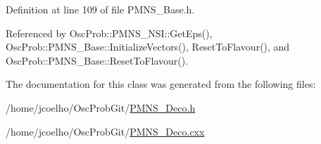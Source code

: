 Definition at line 109 of file P\+M\+N\+S\+\_\+\+Base.\+h.



Referenced by Osc\+Prob\+::\+P\+M\+N\+S\+\_\+\+N\+S\+I\+::\+Get\+Eps(), Osc\+Prob\+::\+P\+M\+N\+S\+\_\+\+Base\+::\+Initialize\+Vectors(), Reset\+To\+Flavour(), and Osc\+Prob\+::\+P\+M\+N\+S\+\_\+\+Base\+::\+Reset\+To\+Flavour().



The documentation for this class was generated from the following files\+:\begin{DoxyCompactItemize}
\item 
/home/jcoelho/\+Osc\+Prob\+Git/\hyperlink{PMNS__Deco_8h}{P\+M\+N\+S\+\_\+\+Deco.\+h}\item 
/home/jcoelho/\+Osc\+Prob\+Git/\hyperlink{PMNS__Deco_8cxx}{P\+M\+N\+S\+\_\+\+Deco.\+cxx}\end{DoxyCompactItemize}
